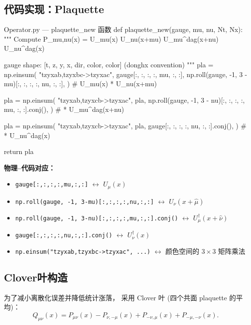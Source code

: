 \documentclass[12pt,a4paper]{ctexart}
\begin{document}
\subsection{代码实现：Plaquette}

\begin{codeblock}{Operator.py --- plaquette\_new 函数}
def plaquette_new(gauge, mu, nu, Nt, Nx):
    """
    Compute P_{mu,nu}(x) = U_mu(x) U_nu(x+mu) U_mu^dag(x+nu) U_nu^dag(x)

    gauge shape: [t, z, y, x, dir, color, color]  (donghx convention)
    """
    pla = np.einsum(
        "tzyxab,tzyxbc->tzyxac",
        gauge[:, :, :, :, mu, :, :],
        np.roll(gauge, -1, 3 - mu)[:, :, :, :, nu, :, :],
    )
    #  U_mu(x) * U_nu(x+mu)

    pla = np.einsum(
        "tzyxab,tzyxcb->tzyxac",
        pla,
        np.roll(gauge, -1, 3 - nu)[:, :, :, :, mu, :, :].conj(),
    )
    #  * U_mu^dag(x+nu)

    pla = np.einsum(
        "tzyxab,tzyxcb->tzyxac",
        pla,
        gauge[:, :, :, :, nu, :, :].conj(),
    )
    #  * U_nu^dag(x)

    return pla
\end{codeblock}

\textbf{物理--代码对应：}
\begin{itemize}
    \item \texttt{gauge[:,:,:,:,mu,:,:]} $\longleftrightarrow$ $U_{\mu}(x)$
    \item \texttt{np.roll(gauge, -1, 3-mu)[:,:,:,:,nu,:,:]} $\longleftrightarrow$
        $U_{\nu}(x+\hat{\mu})$
    \item \texttt{np.roll(gauge, -1, 3-nu)[:,:,:,:,mu,:,:].conj()} $\longleftrightarrow$
        $U^{\dagger}_{\mu}(x+\hat{\nu})$
    \item \texttt{gauge[:,:,:,:,nu,:,:].conj()} $\longleftrightarrow$
        $U^{\dagger}_{\nu}(x)$
    \item \texttt{np.einsum("tzyxab,tzyxbc->tzyxac", ...)} $\longleftrightarrow$
        颜色空间的 $3\times 3$ 矩阵乘法
\end{itemize}

\subsection{Clover叶构造}

为了减小离散化误差并降低统计涨落，
采用 Clover 叶 (四个共面 plaquette 的平均)\cite{场强张量, gluon_pdf_derivation}：
\begin{equation}\label{eq:clover}
\boxed{
Q_{\mu\nu}(x) = P_{\mu\nu}(x)
    - P_{\nu,-\mu}(x)
    + P_{-\nu,\mu}(x)
    + P_{-\mu,-\nu}(x).
}
\end{equation}
\end{document}
